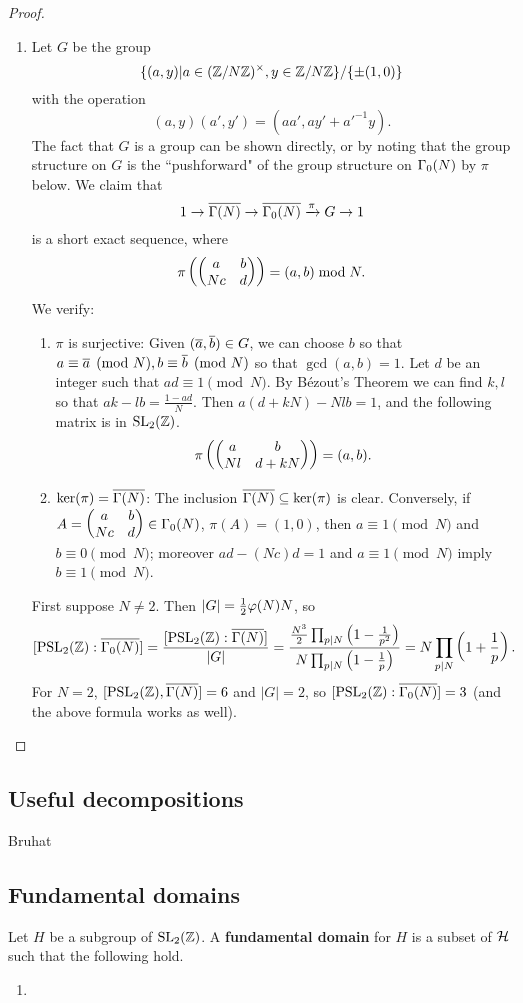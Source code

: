 \begin{proof}
\begin{enumerate}
\item
Let $G$ be the group
\[
\{
(a,y)|a\in (\Z/N\Z)^{\times},y\in \Z/N\Z
\}/\{\pm(1,0)\}
\]
with the operation
\[
(a,y)(a',y')=(aa',ay'+a'^{-1}y).
\]
The fact that $G$ is a group can be shown directly, or by noting that the group structure on $G$ is the ``pushforward" of the group structure on $\Ga_0(N)$ by $\pi$ below.
We claim that
\[
1\to \overline{\Ga(N)}\to \overline{\Ga_0(N)} \xra{\pi}G\to 1
\]
is a short exact sequence, where 
\[
\pi\pa{\matt ab{Nc}d}=(a,b)\bmod N.
\]
We verify:
\begin{enumerate}
\item
$\pi$ is surjective: Given $(\ol{a},\ol{b})\in G$, we can choose $b$ so that $a\equiv \ol{a}\pmod N,b\equiv \ol{b}\pmod N$ so that $\gcd(a,b)=1$.
Let $d$ be an integer such that $ad\equiv 1\pmod N$. By B\'ezout's Theorem we can find $k,l$ so that $ak-lb=\frac{1-ad}{N}$. Then $a(d+kN)-Nlb=1$, and the following  matrix is in $\SL_2(\Z)$.
\[
\pi\pa{\matt ab{Nl}{d+kN}}=(a,b).
\]
\item
$\ker(\pi)=\overline{\Ga(N)}$: The inclusion $\overline{\Ga(N)}\subeq \ker (\pi)$ is clear.
Conversely, if $A=\matt ab{Nc}d\in \Ga_0(N)$, $\pi(A)=(1,0)$, then $a\equiv 1\pmod N$ and $b\equiv 0\pmod N$; moreover $ad-(Nc)d=1$ and $a\equiv 1\pmod N$ imply $b\equiv 1 \pmod N$. 
\end{enumerate}
First suppose $N\neq 2$.
Then $|G|=\rc{2}\ph(N)N$, so
\[
[\PSL_2(\Z):\ol{\Ga_0(N)}]=\frac{[\PSL_2(\Z):\ol{\Ga(N)}]}{|G|}=\frac{\frac{N^3}{2}\prod_{p|N}\pa{1-\rc{p^2}}}{N\prod_{p|N}\pa{1-\rc p}}=N\prod_{p|N}\pa{1+\rc p}.
\]
For $N=2$, $[\PSL_2(\Z),\ol{\Ga(N)}]=6$ and $|G|=2$, so $[\PSL_2(\Z):\ol{\Ga_0(N)}]=3$ (and the above formula works as well).
\end{enumerate}
\end{proof}
\subsection{Useful decompositions}
Bruhat
\subsection{Fundamental domains}
\begin{df}
Let $H$ be a subgroup of $\SL_2(\Z)$. A \textbf{fundamental domain} for $H$ is a subset of $\cal H$ such that the following hold.
\begin{enumerate}
\item 
\end{enumerate}
\end{df}

